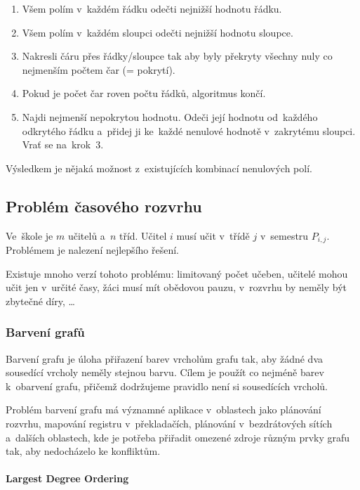 \begin{enumerate}
    \item Všem polím v~každém řádku odečti nejnižší hodnotu řádku.
    \item Všem polím v~každém sloupci odečti nejnižší hodnotu sloupce.
    \item Nakresli čáru přes řádky/sloupce tak aby byly překryty všechny nuly co nejmenším počtem čar (= pokrytí).
    \item Pokud je počet čar roven počtu řádků, algoritmus končí.
    \item Najdi nejmenší nepokrytou hodnotu. Odeči její hodnotu od~každého odkrytého řádku a~přidej ji ke~každé nenulové hodnotě v~zakrytému sloupci. Vrať se na~krok~3.
\end{enumerate}

Výsledkem je nějaká možnost z~existujících kombinací nenulových polí.

\subsection{Problém časového rozvrhu}

Ve~škole je $m$ učitelů a~$n$ tříd.
Učitel $i$ musí učit v~třídě $j$ v~semestru $P_{i,j}$.
Problémem je nalezení nejlepšího řešení.

Existuje mnoho verzí tohoto problému:
limitovaný počet učeben,
učitelé mohou učit jen v~určité časy,
žáci musí mít obědovou pauzu,
v~rozvrhu by neměly být zbytečné díry,
\dots

\subsubsection{Barvení grafů}

Barvení grafu je úloha přiřazení barev vrcholům grafu tak, aby žádné dva sousedící vrcholy neměly stejnou barvu. Cílem je použít co nejméně barev k~obarvení grafu, přičemž dodržujeme pravidlo není si sousedících vrcholů.

Problém barvení grafu má významné aplikace v~oblastech jako plánování rozvrhu, mapování registru v~překladačích, plánování v~bezdrátových sítích a~dalších oblastech, kde je potřeba přiřadit omezené zdroje různým prvky grafu tak, aby nedocházelo ke konfliktům.

\paragraph{Largest Degree Ordering}

